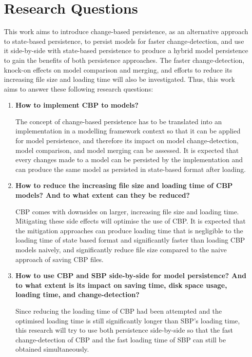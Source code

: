 \documentclass[12pt, a4paper]{report} \usepackage[titletoc]{appendix}
\begin{document}
\section{Research Questions}
\label{sec:research_questions}
This work aims to introduce change-based persistence, as an alternative approach to state-based persistence, to persist models for faster change-detection, and use it side-by-side with state-based persistence to produce a hybrid model persistence to gain the benefits of both persistence approaches. The faster change-detection, knock-on effects on model comparison and merging, and efforts to reduce its increasing file size and loading time will also be investigated. Thus, this work aims to answer these following research questions: 
\begin{enumerate} 
	\item \textbf{How to implement CBP to models?} 
	
	The concept of change-based persistence has to be translated into an implementation in a modelling framework context so that it can be applied for model persistence, and therefore its impact on model change-detection, model comparison, and model merging can be assessed. It is expected that every changes made to a model can be persisted by the implementation and can produce the same model as persisted in state-based format after loading.
	
	\item \textbf{How to reduce the increasing file size and loading time of CBP models? And to what extent can they be reduced?} 
	
	CBP comes with downsides on larger, increasing file size and loading time. Mitigating these side effects will optimise the use of CBP. It is expected that the mitigation approaches can produce loading time that is negligible to the loading time of state based format and significantly faster than loading CBP models naively, and significantly reduce file size compared to the naive approach of saving CBP files. 
	
	\item \textbf{How to use CBP and SBP side-by-side for model persistence? And to what extent is its impact on saving time, disk space usage, loading time, and change-detection?} 
	
	Since reducing the loading time of CBP had been attempted and the optimised loading time is still significantly longer than SBP's loading time, this research will try to use both persistence side-by-side so that the fast change-detection of CBP and the fast loading time of SBP can still be obtained simultaneously. 
	

\end{enumerate}
\end{document}
